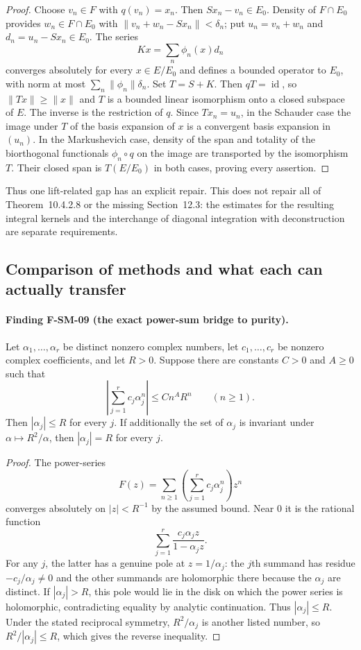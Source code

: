 \documentclass[11pt,a4paper]{article}
\theoremstyle{definition}\newtheorem{definition}[theorem]{Definition}
\theoremstyle{remark}\newtheorem{remark}[theorem]{Remark}
\begin{document}
\begin{proof}
Choose $v_n\in F$ with $q(v_n)=x_n$.  Then $Sx_n-v_n\in E_0$.
Density of $F\cap E_0$ provides $w_n\in F\cap E_0$ with
$\|v_n+w_n-Sx_n\|<\delta_n$; put $u_n=v_n+w_n$ and
$d_n=u_n-Sx_n\in E_0$.  The series
\[
 Kx=\sum_n\phi_n(x)d_n
\]
converges absolutely for every $x\in E/E_0$ and defines a bounded
operator to $E_0$, with norm at most
$\sum_n\|\phi_n\|\delta_n$.  Set $T=S+K$.
Then $qT=\operatorname{id}$, so $\|Tx\|\geq\|x\|$ and $T$
is a bounded linear isomorphism onto a closed subspace of $E$.
The inverse is the restriction of $q$.  Since $Tx_n=u_n$, in the
Schauder case the image under $T$ of the basis expansion of $x$ is a
convergent basis expansion in $(u_n)$.  In the Markushevich case,
density of the span and totality of the biorthogonal functionals
$\phi_n\circ q$ on the image are transported by the isomorphism $T$.
Their closed span is $T(E/E_0)$ in both cases, proving every assertion.
\end{proof}

Thus one lift-related gap has an explicit repair.  This does not repair
all of Theorem~10.4.2.8 or the missing Section~12.3: the estimates for
the resulting integral kernels and the interchange of diagonal
integration with deconstruction are separate requirements.

\subsection{Comparison of methods and what each can actually transfer}

\paragraph{Finding F-SM-09 (the exact power-sum bridge to purity).}
Let $\alpha_1,\ldots,\alpha_r$ be distinct nonzero complex numbers,
let $c_1,\ldots,c_r$ be nonzero complex coefficients, and let $R>0$.
Suppose there are constants $C>0$ and $A\geq0$ such that
\[
 \left|\sum_{j=1}^r c_j\alpha_j^n\right|\leq C n^A R^n
 \qquad(n\geq1).
\]
Then $|\alpha_j|\leq R$ for every $j$.  If additionally the set of
$\alpha_j$ is invariant under $\alpha\mapsto R^2/\alpha$, then
$|\alpha_j|=R$ for every $j$.

\begin{proof}
The power-series
\[
 F(z)=\sum_{n\geq1}\left(\sum_{j=1}^r c_j\alpha_j^n\right)z^n
\]
converges absolutely on $|z|<R^{-1}$ by the assumed bound.  Near $0$ it
is the rational function
\[
 \sum_{j=1}^r\frac{c_j\alpha_jz}{1-\alpha_jz}.
\]
For any $j$, the latter has a genuine pole at $z=1/\alpha_j$:
the $j$th summand has residue $-c_j/\alpha_j\ne0$ and the other
summands are holomorphic there because the $\alpha_j$ are distinct.
If $|\alpha_j|>R$, this pole would lie in the disk on which the power
series is holomorphic, contradicting equality by analytic continuation.
Thus $|\alpha_j|\leq R$.  Under the stated reciprocal symmetry,
$R^2/\alpha_j$ is another listed number, so
$R^2/|\alpha_j|\leq R$, which gives the reverse inequality.
\end{proof}
\end{document}
